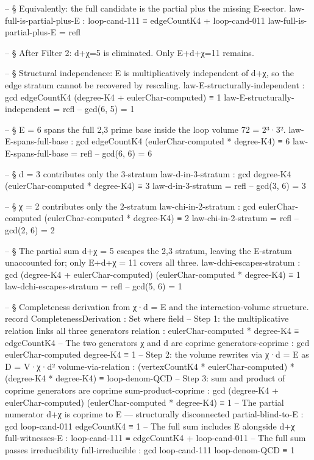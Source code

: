 \documentclass[11pt,a4paper]{book}
\begin{document}
\begin{code}
-- § Equivalently: the full candidate is the partial plus the missing E-sector.
law-full-is-partial-plus-E : loop-cand-111 ≡ edgeCountK4 + loop-cand-011
law-full-is-partial-plus-E = refl

-- § After Filter 2: d+χ=5 is eliminated. Only E+d+χ=11 remains.

-- § Structural independence: E is multiplicatively independent of d+χ, so the edge stratum cannot be recovered by rescaling.
law-E-structurally-independent :
  gcd edgeCountK4 (degree-K4 + eulerChar-computed) ≡ 1
law-E-structurally-independent = refl  -- gcd(6, 5) = 1

-- § E = 6 spans the full {2,3} prime base inside the loop volume 72 = 2³·3².
law-E-spans-full-base : gcd edgeCountK4 (eulerChar-computed * degree-K4) ≡ 6
law-E-spans-full-base = refl  -- gcd(6, 6) = 6

-- § d = 3 contributes only the 3-stratum
law-d-in-3-stratum : gcd degree-K4 (eulerChar-computed * degree-K4) ≡ 3
law-d-in-3-stratum = refl  -- gcd(3, 6) = 3

-- § χ = 2 contributes only the 2-stratum
law-chi-in-2-stratum : gcd eulerChar-computed (eulerChar-computed * degree-K4) ≡ 2
law-chi-in-2-stratum = refl  -- gcd(2, 6) = 2

-- § The partial sum d+χ = 5 escapes the {2,3} stratum, leaving the E-stratum unaccounted for; only E+d+χ = 11 covers all three.
law-dchi-escapes-stratum :
  gcd (degree-K4 + eulerChar-computed) (eulerChar-computed * degree-K4) ≡ 1
law-dchi-escapes-stratum = refl  -- gcd(5, 6) = 1

-- § Completeness derivation from χ·d = E and the interaction-volume structure.
record CompletenessDerivation : Set where
  field
    -- Step 1: the multiplicative relation links all three generators
    relation            : eulerChar-computed * degree-K4 ≡ edgeCountK4
    -- The two generators χ and d are coprime
    generators-coprime  : gcd eulerChar-computed degree-K4 ≡ 1
    -- Step 2: the volume rewrites via χ·d = E as D = V·χ·d²
    volume-via-relation : (vertexCountK4 * eulerChar-computed) * (degree-K4 * degree-K4) ≡ loop-denom-QCD
    -- Step 3: sum and product of coprime generators are coprime
    sum-product-coprime : gcd (degree-K4 + eulerChar-computed) (eulerChar-computed * degree-K4) ≡ 1
    -- The partial numerator d+χ is coprime to E — structurally disconnected
    partial-blind-to-E  : gcd loop-cand-011 edgeCountK4 ≡ 1
    -- The full sum includes E alongside d+χ
    full-witnesses-E    : loop-cand-111 ≡ edgeCountK4 + loop-cand-011
    -- The full sum passes irreducibility
    full-irreducible    : gcd loop-cand-111 loop-denom-QCD ≡ 1


\end{code}
\end{document}
